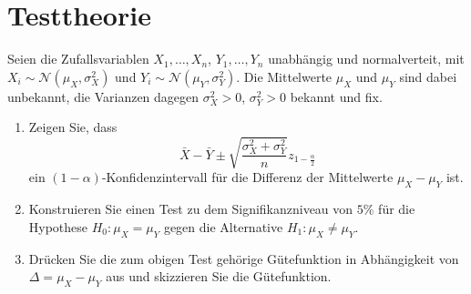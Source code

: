 \section{Testtheorie}

Seien die Zufallsvariablen $X_1,\ldots,X_n$, $Y_1,\ldots,Y_n$ unabhängig und normalverteit, 
mit $X_i\sim\mathcal N(\mu_X, \sigma^2_X)$ und $Y_i\sim\mathcal N(\mu_Y, \sigma^2_Y)$.
Die Mittelwerte $\mu_X$ und $\mu_Y$ sind dabei unbekannt, die Varianzen dagegen
$\sigma_X^2>0$, $\sigma^2_Y>0$ bekannt und fix.
\begin{enumerate}
    \item Zeigen Sie, dass 
        \begin{equation*}
            \bar X - \bar Y \pm \sqrt{ \frac{\sigma^2_X + \sigma^2_Y}{n}  }z_{1-\frac{\alpha}{2}}
        \end{equation*}
        ein $(1-\alpha)$-Konfidenzintervall für die Differenz der Mittelwerte $\mu_X - \mu_Y$ ist.
    \item Konstruieren Sie einen Test zu dem Signifikanzniveau von $5\%$ für die Hypothese
        $H_0: \mu_X = \mu_Y$ gegen die Alternative $H_1: \mu_X \neq \mu_Y$.
    \item Drücken Sie die zum obigen Test gehörige Gütefunktion in Abhängigkeit von
        $\Delta = \mu_X -\mu_Y$ aus und skizzieren Sie die Gütefunktion. 
\end{enumerate}

